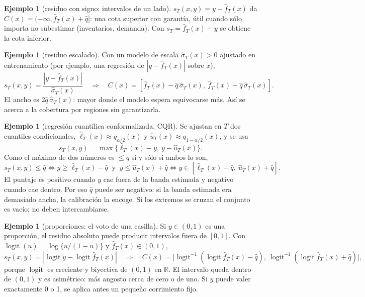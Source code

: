 \documentclass[11pt]{article}
\theoremstyle{plain}
\theoremstyle{definition}
\newtheorem{ejemplo}[teorema]{Ejemplo}
\theoremstyle{remark}
\newcommand{\qhat}{\widehat q}
\newcommand{\fhat}{\widehat f_T}
\newcommand{\logit}{\operatorname{logit}}
\begin{document}
\begin{ejemplo}[residuo con signo: intervalos de un lado]
$s_T(x,y)=y-\fhat(x)$ da $C(x)=(-\infty,\fhat(x)+\qhat]$: una cota superior con garantía, útil cuando
sólo importa no subestimar (inventarios, demanda). Con $s_T=\fhat(x)-y$ se obtiene la cota inferior.
\end{ejemplo}

\begin{ejemplo}[residuo escalado]
Con un modelo de escala $\widehat\sigma_T(x)>0$ ajustado en entrenamiento (por ejemplo, una
regresión de $|y-\fhat(x)|$ sobre $x$),
\[
 s_T(x,y)=\frac{|y-\fhat(x)|}{\widehat\sigma_T(x)}\quad\Longrightarrow\quad
 C(x)=[\fhat(x)-\qhat\,\widehat\sigma_T(x),\ \fhat(x)+\qhat\,\widehat\sigma_T(x)].
\]
El ancho es $2\qhat\,\widehat\sigma_T(x)$: mayor donde el modelo espera equivocarse más. Así se
acerca a la cobertura por regiones sin garantizarla.
\end{ejemplo}

\begin{ejemplo}[regresión cuantílica conformalizada, CQR]
Se ajustan en $T$ dos cuantiles condicionales, $\widehat\ell_T(x)\approx q_{\alpha/2}(x)$ y
$\widehat u_T(x)\approx q_{1-\alpha/2}(x)$, y se usa
\[
 s_T(x,y)=\max\{\widehat\ell_T(x)-y,\ y-\widehat u_T(x)\}.
\]
Como el máximo de dos números es $\le\qhat$ si y sólo si ambos lo son,
\[
 s_T(x,y)\le\qhat\iff y\ge\widehat\ell_T(x)-\qhat\ \text{ y }\ y\le\widehat u_T(x)+\qhat
 \iff y\in[\widehat\ell_T(x)-\qhat,\ \widehat u_T(x)+\qhat].
\]
El puntaje es positivo cuando $y$ cae fuera de la banda estimada y negativo cuando cae dentro. Por
eso $\qhat$ puede ser negativo: si la banda estimada era demasiado ancha, la calibración la encoge.
Si los extremos se cruzan el conjunto es vacío; no deben intercambiarse.
\end{ejemplo}

\begin{ejemplo}[proporciones: el voto de una casilla]
Si $y\in(0,1)$ es una proporción, el residuo absoluto puede producir intervalos fuera de $[0,1]$. Con
$\logit(u)=\log\{u/(1-u)\}$ y $\fhat(x)\in(0,1)$,
\[
 s_T(x,y)=|\logit y-\logit\fhat(x)|\quad\Longrightarrow\quad
 C(x)=\bigl[\logit^{-1}(\logit\fhat(x)-\qhat),\ \logit^{-1}(\logit\fhat(x)+\qhat)\bigr],
\]
porque $\logit$ es creciente y biyectiva de $(0,1)$ en $\mathbb R$. El intervalo queda dentro de
$(0,1)$ y es asimétrico: más angosto cerca de cero o de uno. Si $y$ puede valer exactamente 0 o 1, se
aplica antes un pequeño corrimiento fijo.
\end{ejemplo}
\end{document}
